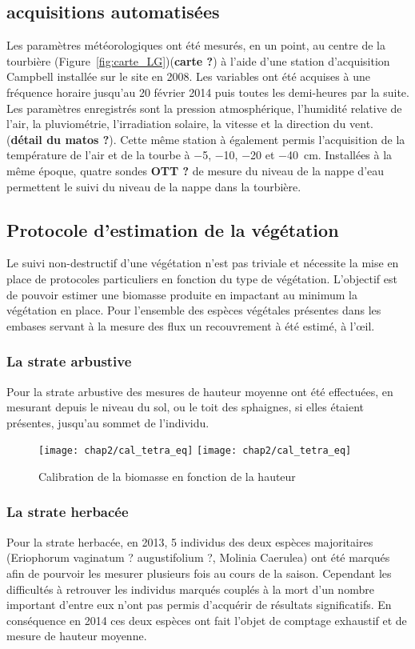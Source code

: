 \subsection{acquisitions automatisées}

Les paramètres météorologiques ont été mesurés, en un point, au centre de la tourbière (Figure~\ref{fig:carte_LG})(\textbf{carte ?}) à l'aide d'une station d'acquisition Campbell installée sur le site en 2008.
Les variables ont été acquises à une fréquence horaire jusqu'au 20 février 2014 puis toutes les demi-heures par la suite. 
Les paramètres enregistrés sont la pression atmosphérique, l'humidité relative de l'air, la pluviométrie, l'irradiation solaire, la vitesse et la direction du vent. (\textbf{détail du matos ?}).
Cette même station à également permis l'acquisition de la température de l'air et de la tourbe à \num{-5}, \num{-10}, \num{-20} et \SIlist{-40}{\cm}.
Installées à la même époque, quatre sondes \textbf{OTT ?} de mesure du niveau de la nappe d'eau permettent le suivi du niveau de la nappe dans la tourbière.

\subsection{Protocole d'estimation de la végétation}

Le suivi non-destructif d'une végétation n'est pas triviale et nécessite la mise en place de protocoles particuliers en fonction du type de végétation.
L'objectif est de pouvoir estimer une biomasse produite en impactant au minimum la végétation en place.
Pour l'ensemble des espèces végétales présentes dans les embases servant à la mesure des flux un recouvrement à été estimé, à l’œil.


\subsubsection{La strate arbustive}
Pour la strate arbustive des mesures de hauteur moyenne ont été effectuées, en mesurant depuis le niveau du sol, ou le toit des sphaignes, si elles étaient présentes, jusqu'au sommet de l'individu.
\begin{figure}
\texttt{[image: chap2/cal\_tetra\_eq]}
\texttt{[image: chap2/cal\_tetra\_eq]}
\caption{Calibration de la biomasse en fonction de la hauteur}
\label{fig:cal_arbu}
\end{figure}

\subsubsection{La strate herbacée}
Pour la strate herbacée, en 2013, 5 individus des deux espèces majoritaires (Eriophorum vaginatum ? augustifolium ?, Molinia Caerulea) ont été marqués afin de pourvoir les mesurer plusieurs fois au cours de la saison.
Cependant les difficultés à retrouver les individus marqués couplés à la mort d'un nombre important d'entre eux n'ont pas permis d'acquérir de résultats significatifs.
En conséquence en 2014 ces deux espèces ont fait l'objet de comptage exhaustif et de mesure de hauteur moyenne.



